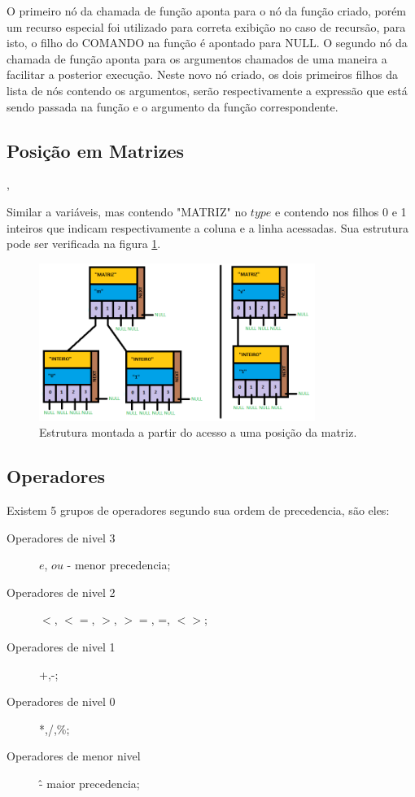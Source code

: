 \documentclass[a4paper,12pt]{report}
\begin{document}
O primeiro n\'o da chamada de fun\c{c}\~ao aponta para o n\'o da fun\c{c}\~ao criado, por\'em um recurso especial foi utilizado para correta exibi\c{c}\~ao no caso de recurs\~ao, para isto, o filho do COMANDO na fun\c{c}\~ao \'e apontado para NULL.
O segundo n\'o da chamada de fun\c{c}\~ao aponta para os argumentos chamados de uma maneira a facilitar a posterior execu\c{c}\~ao. Neste novo n\'o criado, os dois primeiros filhos da lista de n\'os contendo os argumentos, ser\~ao respectivamente a express\~ao que est\'a sendo passada na fun\c{c}\~ao e o argumento da fun\c{c}\~ao correspondente.


\subsection{Posi\c{c}\~ao em Matrizes},

Similar a vari\'aveis, mas contendo "MATRIZ" no $type$ e contendo nos filhos 0 e 1 inteiros que indicam respectivamente a coluna e a linha acessadas. Sua estrutura pode ser verificada na figura \ref{fig:matriz}.

\begin{figure}
\centering
\includegraphics[width=0.8\textwidth]{imgs/Matriz.png}
\caption{\label{fig:matriz}Estrutura montada a partir do acesso a uma posi\c{c}\~ao da matriz.}
\end{figure}

\subsection{Operadores}

Existem 5 grupos de operadores segundo sua ordem de precedencia, são eles:

\begin{description}
\item[Operadores de nivel 3] $e$, $ou$ - menor precedencia;
\item[Operadores de nivel 2] $<$, $<=$, $>$, $>=$, =, $<>$; 
\item[Operadores de nivel 1] +,-;
\item[Operadores de nivel 0] *,/,\%;
\item[Operadores de menor nivel] \^ - maior precedencia;
\end{description}
\end{document}
